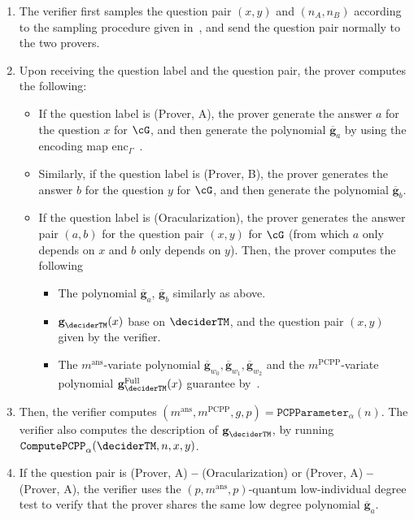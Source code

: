 \begin{enumerate}
	\item  The verifier first samples the question pair $(x,y)$ and $(n_A, n_B)$ according to the sampling procedure given in~, and send the question pair normally to the two provers. 
	\item Upon receiving the question label and the question pair, the prover computes the following:
	\begin{itemize}
		\item If the question label is (Prover, A), the prover generate the  answer $a$ for the question $x$ for $\cG$, and then generate the polynomial $\overline{\textbf{g}}_a$ by using the encoding map $\text{enc}_{\Gamma}$~. 
		\item Similarly, if the question label is (Prover, B), the prover generates the answer $b$ for the question $y$ for $\cG$, and then generate the polynomial $\overline{\textbf{g}}_b$. 
		\item If the question label is (Oracularization), the prover generates the answer pair $(a,b)$ for the question pair $(x,y)$ for $\cG$ (from which $a$ only depends on $x$ and $b$ only depends on $y$). Then, the prover computes the following 
		\begin{itemize}
			\item The polynomial $\overline{\textbf{g}}_a$, $\overline{\textbf{g}}_b$ similarly as above.
			\item $\textbf{g}_{\deciderTM}(x)$ base on $\deciderTM$, and the question pair $(x,y)$ given by the verifier. 
			\item The $m^{\text{ans}}$-variate polynomial $\overline{\textbf{g}}_{w_0}, \overline{\textbf{g}}_{w_1},\overline{\textbf{g}}_{w_2}$ and the $m^{\text{PCPP}}$-variate polynomial $\textbf{g}_{\deciderTM}^{\text{Full}}(x)$ guarantee by~. 
		\end{itemize}
	\end{itemize}
	\item Then, the verifier computes $(m^{\text{ans}},m^{\text{PCPP}}, g, p)= \mathtt{PCPParameter}_{\alpha}(n)$. The verifier also computes the description of $\textbf{g}_{\deciderTM}$, by running $\mathtt{ComputePCPP}_{\alpha}(\deciderTM, n, x, y)$. 
	\item If the question pair is (Prover, A) \textbf{--} (Oracularization) or  (Prover, A) \textbf{--} (Prover, A), the verifier uses the $(p, m^{\text{ans}}, p)$-quantum low-individual degree test to verify that the prover shares the same low degree polynomial $\overline{\textbf{g}}_a$. 

\end{enumerate}

